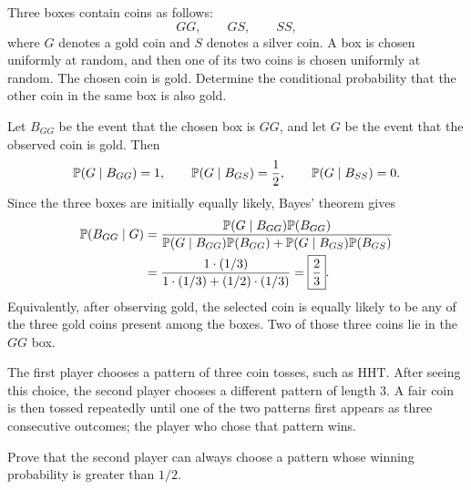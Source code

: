     \begin{expectedproblem}
        Three boxes contain coins as follows:
        \[
            GG,\qquad GS,\qquad SS,
        \]
        where $G$ denotes a gold coin and $S$ denotes a silver coin. A box is
        chosen uniformly at random, and then one of its two coins is chosen
        uniformly at random. The chosen coin is gold. Determine the
        conditional probability that the other coin in the same box is also
        gold.
    \end{expectedproblem}

    \begin{solution}
        Let $B_{GG}$ be the event that the chosen box is $GG$, and let $G$ be
        the event that the observed coin is gold. Then
        \[
            \mathbb{P}(G\mid B_{GG})=1,
            \qquad
            \mathbb{P}(G\mid B_{GS})=\frac12,
            \qquad
            \mathbb{P}(G\mid B_{SS})=0.
        \]
        Since the three boxes are initially equally likely, Bayes' theorem
        gives
        \[
            \begin{aligned}
                \mathbb{P}(B_{GG}\mid G)
                &=
                \frac{
                    \mathbb{P}(G\mid B_{GG})\mathbb{P}(B_{GG})
                }{
                    \mathbb{P}(G\mid B_{GG})\mathbb{P}(B_{GG})
                    +
                    \mathbb{P}(G\mid B_{GS})\mathbb{P}(B_{GS})
                }\\
                &=
                \frac{1\cdot(1/3)}
                {1\cdot(1/3)+(1/2)\cdot(1/3)}
                =
                \boxed{\frac23}.
            \end{aligned}
        \]
        Equivalently, after observing gold, the selected coin is equally
        likely to be any of the three gold coins present among the boxes.
        Two of those three coins lie in the $GG$ box.
    \end{solution}

    \begin{expectedproblem}
        The first player chooses a pattern of three coin tosses, such as
        $\mathrm{HHT}$. After seeing this choice, the second player chooses a
        different pattern of length $3$. A fair coin is then tossed repeatedly
        until one of the two patterns first appears as three consecutive
        outcomes; the player who chose that pattern wins.

        Prove that the second player can always choose a pattern whose winning
        probability is greater than $1/2$.
    \end{expectedproblem}


